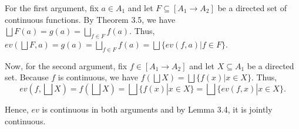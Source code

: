 For the first argument, fix $a \in A_1$ and let $F \subseteq [A_1 \to A_2]$ be a directed set of continuous functions. 
By Theorem 3.5, we have $\bigsqcup F(a) = g(a) = \bigsqcup_{f \in F} f(a)$. Thus,
$ev(\bigsqcup F, a) = g(a) = \bigsqcup_{f \in F} f(a) = \bigsqcup \{ ev(f,a) | f \in F\} $.


Now, for the second argument, fix $f \in [A_1 \to A_2]$ and let $X \subseteq A_1$ be a directed set.
Because $f$ is continuous, we have $f(\bigsqcup X) = \bigsqcup \{f(x) | x \in X\}$. Thus,
$$ ev(f, \bigsqcup X) = f(\bigsqcup X) = \bigsqcup \{f(x) | x \in X\} = \bigsqcup \{ ev(f,x) | x \in X \}. $$

Hence, $ev$ is continuous in both arguments and by Lemma 3.4, it is jointly continuous.